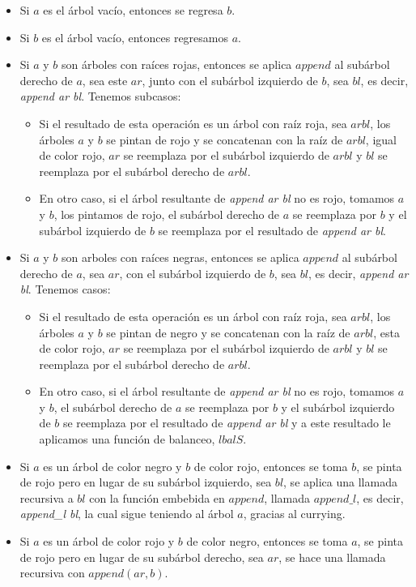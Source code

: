\begin{itemize}
    \item Si $a$ es el \'arbol vacío, entonces se regresa $b$.
    \item Si $b$ es el \'arbol vacío, entonces regresamos $a$.
    \item Si $a$ y $b$ son \'arboles con raíces rojas, entonces se aplica $append$ al subárbol
    derecho de $a$, sea este $ar$, junto con el subárbol izquierdo de $b$, sea $bl$, es decir,
    \textit{append ar bl}. Tenemos subcasos:
    \begin{itemize}
      \item Si el resultado de esta operación es un árbol con raíz roja, sea $arbl$, los \'arboles
      $a$ y $b$ se pintan de rojo y se concatenan con la raíz de $arbl$, igual de color rojo, $ar$
      se reemplaza por el subárbol izquierdo de $arbl$ y $bl$ se reemplaza por el subárbol derecho
      de $arbl$.
      \item En otro caso, si el \'arbol resultante de \textit{append ar bl} no es rojo, tomamos $a$
      y $b$, los pintamos de rojo, el subárbol derecho de $a$ se reemplaza por $b$ y el subárbol
      izquierdo de $b$ se reemplaza por el resultado de \textit{append ar bl}.
    \end{itemize}
    \item Si $a$ y $b$ son arboles con raíces negras, entonces se aplica $append$ al subárbol
    derecho de $a$, sea $ar$, con el subárbol izquierdo de $b$, sea $bl$, es decir, \textit{append
    ar bl}. Tenemos casos:
    \begin{itemize}
      \item Si el resultado de esta operación es un árbol con raíz roja, sea $arbl$, los \'arboles
      $a$ y $b$ se pintan de negro y se concatenan con la raíz de $arbl$, esta de color rojo, $ar$
      se reemplaza por el subárbol izquierdo de $arbl$ y $bl$ se reemplaza por el subárbol derecho
      de $arbl$.
      \item En otro caso, si el \'arbol resultante de \textit{append ar bl} no es rojo, tomamos $a$
      y $b$, el subárbol derecho de $a$ se reemplaza por $b$ y el subárbol izquierdo de $b$ se
      reemplaza por el resultado de \textit{append ar bl} y a este resultado le aplicamos una
      función de balanceo, $lbalS$.
    \end{itemize}
    \item Si $a$ es un \'arbol de color negro y $b$ de color rojo, entonces se toma $b$, se pinta
    de rojo pero en lugar de su subárbol izquierdo, sea $bl$, se aplica una llamada recursiva a
    $bl$ con la funci\'on embebida en $append$, llamada $append\_l$, es decir, \textit{append\_l
    bl}, la cual sigue teniendo al \'arbol $a$, gracias al currying\cite{Currying}.
    \item Si $a$ es un \'arbol de color rojo y $b$ de color negro, entonces se toma $a$, se pinta
    de rojo pero en lugar de su subárbol derecho, sea $ar$, se hace una llamada recursiva con
    $append(ar,b)$.
\end{itemize}

